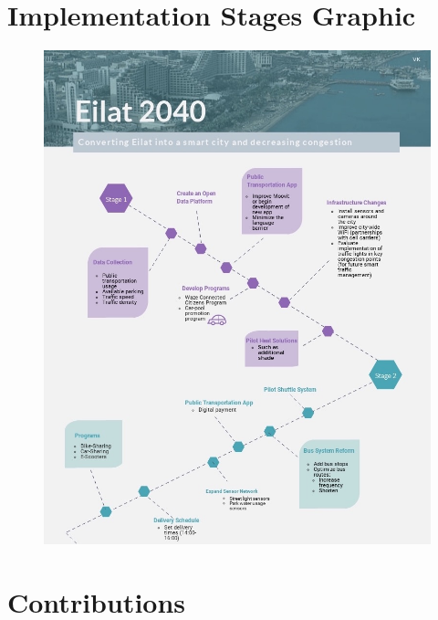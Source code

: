 \documentclass[12pt]{article}                               %
\begin{document}

\newpage


\newpage

\begin{appendices}
\section{Implementation Stages Graphic}
\begin{figure}
    \centering
    \includegraphics{images/stages_p1.jpg}
\end{figure}
\newpage

\section{Contributions}
\end{appendices}
\end{document}
